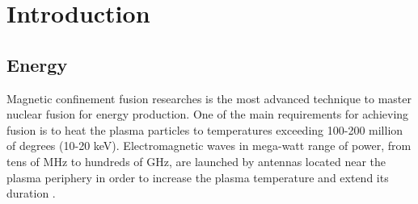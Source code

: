 \setchapterpreamble[u]{\margintoc}
\chapter{Introduction}

\section{Energy}
Magnetic confinement fusion researches is the most advanced technique to master nuclear fusion for energy production. One of the main requirements for achieving fusion is to heat the plasma particles to temperatures exceeding 100-200 million of degrees (10-20 keV). Electromagnetic waves in mega-watt range of power, from tens of MHz to hundreds of GHz, are launched by antennas located near the plasma periphery in order to increase the plasma temperature and extend its duration . 
